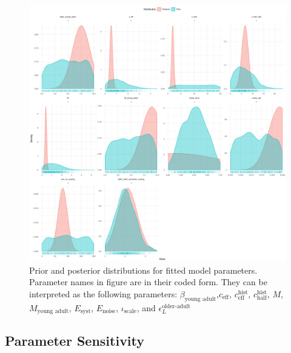 \documentclass[11pt,twoside]{bristolthesis}
\begin{document}
  \begin{figure}
  
  {\centering \includegraphics[width=0.8\linewidth]{chapters/model-fitting/plots/prior-posterior-overview-1} 
  
  }
  
  \caption[Prior and posterior distributions for fitted model parameters.]{Prior and posterior distributions for fitted model parameters. Parameter names in figure are in their coded form. They can be interpreted as the following parameters:  $\beta_{\text{young adult}}$,$c_{\text{eff}}$, $c^{\text{hist}}_{\text{eff}}$, $c^{\text{hist}}_{\text{half}}$, $M$, $M_{\text{young adult}}$, $E_{\text{syst}}$, $E_{\text{noise}}$, $\iota_{\text{scale}}$, and $\epsilon^{\text{older-adult}}_L$}\label{fig:09-fig-prior-params}
  \end{figure}
  \hypertarget{parameter-sensitivity-1}{%
  \subsection{Parameter Sensitivity}\label{parameter-sensitivity-1}}
  
\end{document}
